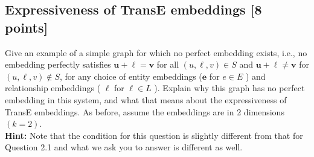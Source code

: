 \subsection{Expressiveness of TransE embeddings [8 points]}
Give an example of a simple graph for which no perfect embedding exists, i.e., no embedding perfectly satisfies $\mathbf{u}+\boldsymbol{\ell}=\mathbf{v}$ for all $(u, \ell, v) \in S$ and $\mathbf{u}+\boldsymbol{\ell} \neq \mathbf{v}$ for $(u, \ell, v) \notin S$, for any choice of entity embeddings ($\mathbf{e}$ for $e \in E$ ) and relationship embeddings ( $\boldsymbol{\ell}$ for $\ell \in L$ ). Explain why this graph has no perfect embedding in this system, and what that means about the expressiveness of TransE embeddings. As before, assume the embeddings are in 2 dimensions $(k=2)$.\\
\textbf{Hint: }Note that the condition for this question is slightly different from that for Question 2.1 and what we ask you to answer is different as well.

